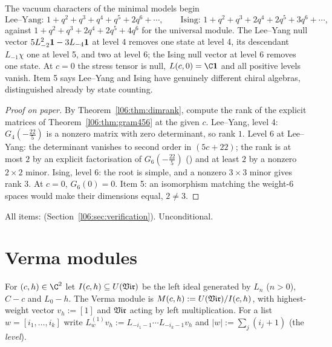 \begin{physics}
The vacuum characters of the minimal models begin
\begin{equation*}
 \text{Lee--Yang: }1+q^2+q^3+q^4+q^5+2q^6+\cdots,\qquad
 \text{Ising: }1+q^2+q^3+2q^4+2q^5+3q^6+\cdots,
\end{equation*}
against $1+q^2+q^3+2q^4+2q^5+4q^6$ for the universal module. The Lee--Yang null vector
$5L_{-2}^2\mathbf{1}-3L_{-4}\mathbf{1}$ at level $4$ removes one state at level 4, its descendant $L_{-1}\chi$
one at level 5, and two at level 6; the Ising null vector at level 6 removes one state. At $c = 0$ the
stress tensor is null, $\lsixL = \C\lsixvac$ and all positive levels vanish. Item 5 says Lee--Yang and Ising
have genuinely different chiral algebras, distinguished already by state counting.
\end{physics}

\begin{proof}[Proof on paper]
By Theorem~\ref{l06:thm:dimrank}, compute the rank of the explicit matrices of
Theorem~\ref{l06:thm:gram456} at the given $c$. Lee--Yang, level 4: $G_4(-\frac{22}5)$ is a nonzero matrix
with zero determinant, so rank $1$. Level 6 at Lee--Yang: the determinant vanishes to second order in
$(5c+22)$; the rank is at most $2$ by an explicit factorisation of $G_6(-\frac{22}5)$
() and at least $2$ by a nonzero $2\times2$ minor. Ising, level 6: the root is simple, and a nonzero $3\times3$ minor gives rank $3$.
At $c = 0$, $G_6(0) = 0$. Item 5: an isomorphism matching the weight-6 spaces would make their dimensions
equal, $2\ne3$.
\end{proof}

\begin{status}
All items: \lean{[propext, Classical.}\allowbreak{}\allowbreak\lean{sound]} (Section~\ref{l06:sec:verification}).
Unconditional.
\end{status}

\section{Verma modules}\label{l06:sec:verma}

\begin{definition}\label{l06:def:verma}
For $(c,h)\in\C^2$ let $I(c,h)\subseteq U(\mathfrak{Vir})$ be the left ideal generated by $L_n$ ($n>0$), $C-c$ and
$L_0-h$. The Verma module is $M(c,h) := U(\mathfrak{Vir})/I(c,h)$, with highest-weight vector $v_h := [1]$ and
$\mathfrak{Vir}$ acting by left multiplication. For a list $w = [i_1,\dots,i_k]$ write
$L^{(1)}_wv_h := L_{-i_1-1}\cdots L_{-i_k-1}v_h$ and $|w| := \sum_j(i_j+1)$ (the \emph{level}).
\end{definition}

